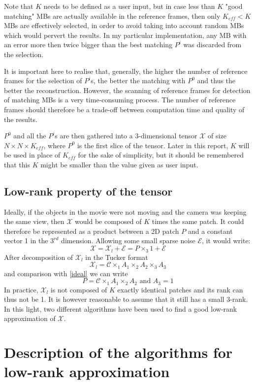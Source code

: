 \documentclass[a4paper, 11pt]{article} %
\def \be {\begin{equation*}}
\def \ee {\end{equation*}}
\def \bee {\begin{equation}}
\def \eee {\end{equation}}
\def \X {\mathcal{X}}
\def \t {\times}
\def \C {\mathcal{C}}
\def \E {\mathcal{E}}
\def \Xl {\mathcal{X}_{l}}
\begin{document}
Note that $K$ needs to be defined as a user input, but in case less than $K$ "good matching" MBs are actually available in the reference frames, then only $K_{eff}<K$ MBs are effectively selected, in order to avoid taking into account random MBs which would pervert the results. 
In my particular implementation, any MB with an error more then twice bigger than the best matching $P^i$ was discarded from the selection.

It is important here to realise that, generally, the higher the number of reference frames for the selection of $P^i$s, the better the matching with $P^0$ and thus the better the reconstruction. However, the scanning of reference frames for detection of matching MBs is a very time-consuming process. The number of reference frames should therefore be a trade-off between computation time and quality of the results. 

$P^0$ and all the $P^i$s are then gathered into a 3-dimensional tensor $\X$ of size $N\t N\t K_{eff}$, where $P^0$ is the first slice of the tensor. Later in this report, $K$ will be used in place of $K_{eff}$ for the sake of simplicity, but it should be remembered that this $K$ might be smaller than the value given as user input.

\subsection{Low-rank property of the tensor}
\label{subsecIdeal}

Ideally, if the objects in the movie were not moving and the camera was keeping the same view, then $\X$ would be composed of $K$ times the same patch. It could therefore be represented as a product between a 2D patch $P$ and a constant vector 1 in the $3^{rd}$ dimension. Allowing some small sparse noise $\mathcal{E}$, it would write:
\bee
\X= \Xl+\E=P\t_3 1+\E
\label{ideal}
\eee
After decomposition of $\Xl$ in the Tucker format
\be
\X_l=\C\t_1 A_1 \t_2 A_2 \t_3 A_3
\ee
and comparison with \autoref{ideal} we can write
\be
P=\C \t_1 A_1\t_2 A_2 \mbox{ and } A_3=1
\ee
In practice, $\Xl$ is not composed of $K$ exactly identical patches and its rank can thus not be 1. It is however reasonable to assume that it still has a small 3-rank. In this light, two different algorithms have been used to find a good low-rank approximation of $\X$.

\section{Description of the algorithms for low-rank approximation}
\end{document}
